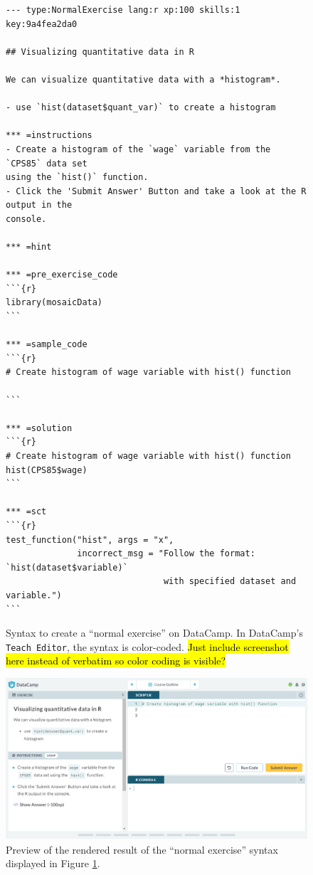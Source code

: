 \documentclass{tise_style_doi}
\begin{document}
\begin{figure}
\begin{Verbatim}[frame=single]
--- type:NormalExercise lang:r xp:100 skills:1 key:9a4fea2da0

## Visualizing quantitative data in R

We can visualize quantitative data with a *histogram*.

- use `hist(dataset$quant_var)` to create a histogram

*** =instructions
- Create a histogram of the `wage` variable from the `CPS85` data set
using the `hist()` function.
- Click the 'Submit Answer' Button and take a look at the R output in the
console.

*** =hint

*** =pre_exercise_code
```{r}
library(mosaicData)
```

*** =sample_code
```{r}
# Create histogram of wage variable with hist() function

```

*** =solution
```{r}
# Create histogram of wage variable with hist() function
hist(CPS85$wage)
```

*** =sct
```{r}
test_function("hist", args = "x",
              incorrect_msg = "Follow the format: `hist(dataset$variable)`
                               with specified dataset and variable.")
```

\end{Verbatim}
\caption{Syntax to create a ``normal exercise'' on DataCamp.  In DataCamp's
\texttt{Teach Editor}, the syntax is color-coded. \hl{Just include
screenshot here instead of verbatim so color coding is visible?}}
\label{fig:code1}
\end{figure}

\begin{figure}[h]
\includegraphics[width = 1.0\textwidth] {code1preview.png}
\caption{Preview of the rendered result of the ``normal exercise'' syntax displayed
in Figure \ref{fig:code1}.}
\label{fig:preview}
\end{figure}
\end{document}
